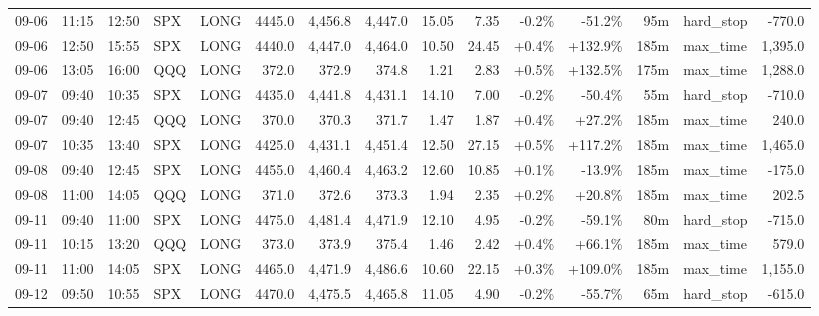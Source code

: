 \documentclass[11pt,a4paper,twoside]{article}
\begin{document}
\begin{landscape}
\begin{center}
\begin{longtable}{>{\color{txtmain}}l l l l l r r r r r r r r >{\color{txtmain}}l r}
09-06 & 11:15 & 12:50 & SPX & LONG & 4445.0 & 4,456.8 & 4,447.0 & 15.05 & 7.35 & \textcolor{lossred}{-0.2\%} & \textcolor{lossred}{-51.2\%} & 95m & hard\_stop & \textcolor{lossred}{-770.0} \\
09-06 & 12:50 & 15:55 & SPX & LONG & 4440.0 & 4,447.0 & 4,464.0 & 10.50 & 24.45 & \textcolor{wingreen}{+0.4\%} & \textcolor{wingreen}{+132.9\%} & 185m & max\_time & \textcolor{wingreen}{1,395.0} \\
09-06 & 13:05 & 16:00 & QQQ & LONG & 372.0 & 372.9 & 374.8 & 1.21 & 2.83 & \textcolor{wingreen}{+0.5\%} & \textcolor{wingreen}{+132.5\%} & 175m & max\_time & \textcolor{wingreen}{1,288.0} \\
09-07 & 09:40 & 10:35 & SPX & LONG & 4435.0 & 4,441.8 & 4,431.1 & 14.10 & 7.00 & \textcolor{lossred}{-0.2\%} & \textcolor{lossred}{-50.4\%} & 55m & hard\_stop & \textcolor{lossred}{-710.0} \\
09-07 & 09:40 & 12:45 & QQQ & LONG & 370.0 & 370.3 & 371.7 & 1.47 & 1.87 & \textcolor{wingreen}{+0.4\%} & \textcolor{wingreen}{+27.2\%} & 185m & max\_time & \textcolor{wingreen}{240.0} \\
09-07 & 10:35 & 13:40 & SPX & LONG & 4425.0 & 4,431.1 & 4,451.4 & 12.50 & 27.15 & \textcolor{wingreen}{+0.5\%} & \textcolor{wingreen}{+117.2\%} & 185m & max\_time & \textcolor{wingreen}{1,465.0} \\
09-08 & 09:40 & 12:45 & SPX & LONG & 4455.0 & 4,460.4 & 4,463.2 & 12.60 & 10.85 & \textcolor{wingreen}{+0.1\%} & \textcolor{lossred}{-13.9\%} & 185m & max\_time & \textcolor{lossred}{-175.0} \\
09-08 & 11:00 & 14:05 & QQQ & LONG & 371.0 & 372.6 & 373.3 & 1.94 & 2.35 & \textcolor{wingreen}{+0.2\%} & \textcolor{wingreen}{+20.8\%} & 185m & max\_time & \textcolor{wingreen}{202.5} \\
09-11 & 09:40 & 11:00 & SPX & LONG & 4475.0 & 4,481.4 & 4,471.9 & 12.10 & 4.95 & \textcolor{lossred}{-0.2\%} & \textcolor{lossred}{-59.1\%} & 80m & hard\_stop & \textcolor{lossred}{-715.0} \\
09-11 & 10:15 & 13:20 & QQQ & LONG & 373.0 & 373.9 & 375.4 & 1.46 & 2.42 & \textcolor{wingreen}{+0.4\%} & \textcolor{wingreen}{+66.1\%} & 185m & max\_time & \textcolor{wingreen}{579.0} \\
09-11 & 11:00 & 14:05 & SPX & LONG & 4465.0 & 4,471.9 & 4,486.6 & 10.60 & 22.15 & \textcolor{wingreen}{+0.3\%} & \textcolor{wingreen}{+109.0\%} & 185m & max\_time & \textcolor{wingreen}{1,155.0} \\
09-12 & 09:50 & 10:55 & SPX & LONG & 4470.0 & 4,475.5 & 4,465.8 & 11.05 & 4.90 & \textcolor{lossred}{-0.2\%} & \textcolor{lossred}{-55.7\%} & 65m & hard\_stop & \textcolor{lossred}{-615.0} \\

\end{longtable}
\end{center}
\end{landscape}
\end{document}
